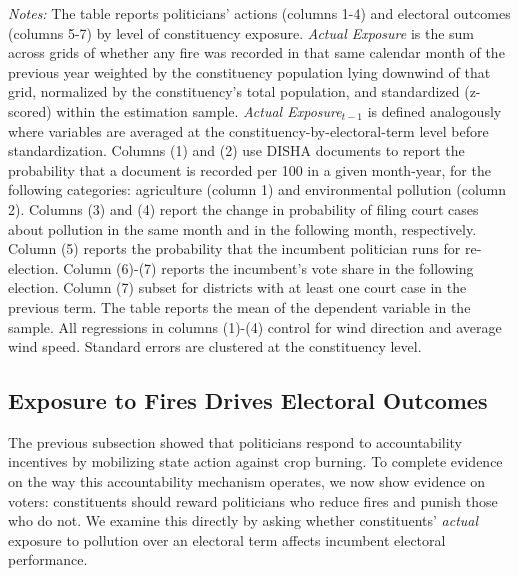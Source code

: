 \documentclass[12pt]{article}
\providecommand{\resultsuffix}{}
\let\SourceInput
\renewcommand{}[1]{%
  \IfFileExists{../../#1\resultsuffix.tex}{\SourceInput{../../#1\resultsuffix.tex}}{%
  \IfFileExists{../../#1}{\SourceInput{../../#1}}{%
    \IfFileExists{../../#1.tex}{\SourceInput{../../#1.tex}}{%
      \fbox{\scriptsize Missing table: \detokenize{#1}}}}}}
\begin{document}
\begin{table}[htbp!] 
\caption{Pollution Exposure, Politicians' Actions, and Electoral Consequences Pop}\label{tab:mechanism}
        \resizebox{\linewidth}{!}{
        
        }
    \begin{minipage}{\textwidth}
        {\footnotesize \textit{Notes:} The table reports politicians' actions (columns 1-4) and electoral outcomes (columns 5-7) by level of constituency exposure.
        \textit{Actual Exposure} is the sum across grids of whether any fire was recorded in that same calendar month of the previous year weighted by the  constituency population lying downwind of that grid, normalized by the  constituency's total population, and standardized (z-scored) within the  estimation sample.
       \textit{Actual Exposure$_{t-1}$} is defined analogously where variables are averaged at  the constituency-by-electoral-term level before standardization.
        Columns (1) and (2) use DISHA documents to report the probability that a document is recorded per 100 in a given month-year, for the following categories: agriculture (column 1) and environmental pollution (column 2). Columns (3) and (4) report the change in probability of filing court cases about pollution in the same month and in the following month, respectively. Column (5) reports the probability that the incumbent politician runs for re-election. Column (6)-(7) reports the incumbent's vote share in the following election. Column (7) subset for districts with at least one court case in the previous term.
        The table reports the mean of the dependent variable in the sample. All regressions in columns (1)-(4) control for wind direction and average wind speed. Standard errors are clustered at the constituency level.
        }
    \end{minipage}
\end{table}



\subsection{Exposure to Fires Drives Electoral Outcomes}

The previous subsection showed that politicians respond to accountability incentives by mobilizing state action against crop burning. To complete evidence on the way this accountability mechanism operates, we now show evidence on voters: constituents should reward politicians who reduce fires and punish those who do not. We examine this directly by asking whether constituents' \textit{actual} exposure to pollution over an electoral term affects incumbent electoral performance.
\end{document}
